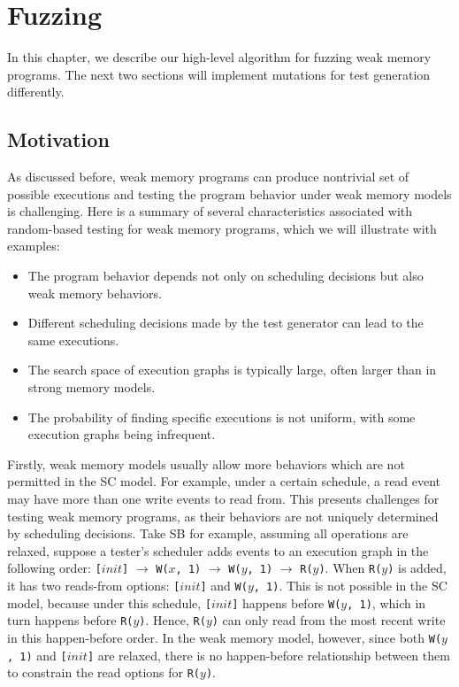 \chapter{\label{cha:fuzz}Fuzzing}

In this chapter, we describe our high-level algorithm for fuzzing weak memory programs. The next two sections will implement mutations for test generation differently.

\section{Motivation}

As discussed before, weak memory programs can produce nontrivial set of possible executions and testing the program behavior under weak memory models is challenging.
Here is a summary of several characteristics associated with random-based testing for weak memory programs, which we will illustrate with examples:
\begin{itemize}
    \item The program behavior depends not only on scheduling decisions but also weak memory behaviors.
    \item Different scheduling decisions made by the test generator can lead to the same executions. 
    \item The search space of execution graphs is typically large, often larger than in strong memory models.
    \item The probability of finding specific executions is not uniform, with some execution graphs being infrequent.    
\end{itemize}


Firstly, weak memory models usually allow more behaviors which are not permitted in the SC model. For example, under a certain schedule, a read event may have more than one write events to read from. This presents challenges for testing weak memory programs, as their behaviors are not uniquely determined by scheduling decisions. Take SB for example, assuming all operations are relaxed, suppose a tester's scheduler adds events to an execution graph in the following order: \texttt{[$init$]} $\rightarrow$ \texttt{W($x$, 1)} $\rightarrow$ \texttt{W($y$, 1)} $\rightarrow$ \texttt{R($y$)}. When \texttt{R($y$)} is added, it has two reads-from options: \texttt{[$init$]} and \texttt{W($y$, 1)}. This is not possible in the SC model, because under this schedule, \texttt{[$init$]} happens before \texttt{W($y$, 1)}, which in turn happens before \texttt{R($y$)}. Hence, \texttt{R($y$)} can only read from the most recent write in this happen-before order. In the weak memory model, however, since both \texttt{W($y$, 1)} and \texttt{[$init$]} are relaxed, there is no happen-before relationship between them to constrain the read options for \texttt{R($y$)}.

